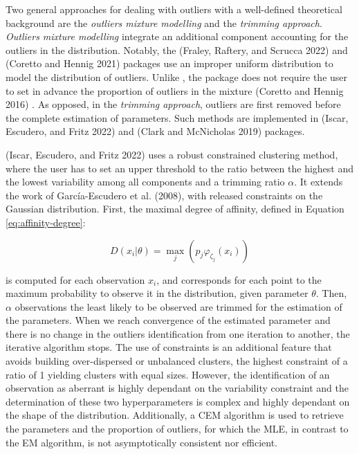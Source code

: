 Two general approaches for dealing with outliers with a well-defined
theoretical background are the \emph{outliers mixture modelling} and the
\emph{trimming approach}. \emph{Outliers mixture modelling} integrate an
additional component accounting for the outliers in the distribution.
Notably, the  (Fraley, Raftery, and Scrucca 2022) and  (Coretto and Hennig 2021)
packages use an improper uniform distribution to model the distribution
of outliers. Unlike , the  package does not
require the user to set in advance the proportion of outliers in the
mixture (Coretto and Hennig 2016) . As opposed, in the \emph{trimming approach},
outliers are first removed before the complete estimation of parameters.
Such methods are implemented in  (Iscar, Escudero, and Fritz 2022) and
 (Clark and McNicholas 2019) packages.

 (Iscar, Escudero, and Fritz 2022) uses a robust constrained clustering
method, where the user has to set an upper threshold to the ratio
between the highest and the lowest variability among all components and
a trimming ratio \(\alpha\). It extends the work of
García-Escudero et al. (2008), with released constraints on the Gaussian
distribution. First, the maximal degree of affinity, defined in Equation
\eqref{eq:affinity-degree}:

\begin{equation}
    D(x_i|\theta)=\max_j \left(p_{j} \varphi_{\zeta_j} (x_i) \right)
\label{eq:affinity-degree}
\end{equation}

is computed for each observation \(x_i\), and corresponds for each point
to the maximum probability to observe it in the distribution, given
parameter \(\theta\). Then, \(\alpha\) observations the least likely to be
observed are trimmed for the estimation of the parameters. When we reach
convergence of the estimated parameter and there is no change in the
outliers identification from one iteration to another, the iterative
algorithm stops. The use of constraints is an additional feature that
avoids building over-dispersed or unbalanced clusters, the highest
constraint of a ratio of 1 yielding clusters with equal sizes. However,
the identification of an observation as aberrant is highly dependant on
the variability constraint and the determination of these two
hyperparameters is complex and highly dependant on the shape of the
distribution. Additionally, a CEM algorithm is used to retrieve the
parameters and the proportion of outliers, for which the MLE, in
contrast to the EM algorithm, is not asymptotically consistent nor
efficient.

